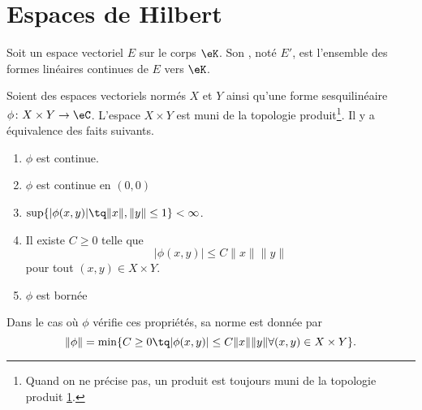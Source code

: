 
\section{Espaces de Hilbert}

\begin{definition}      \label{DEFooKSDFooGIBtrG}
	Soit un espace vectoriel \( E\) sur le corps \( \eK\). Son , noté \( E'\), est l'ensemble des formes linéaires continues de \( E\) vers \( \eK\).
\end{definition}

\begin{proposition}      \label{PROPooQFTSooPFfbCc}
    Soient des espaces vectoriels normés \( X\) et \( Y\) ainsi qu'une forme sesquilinéaire \( \phi\colon X\times Y\to \eC\). L'espace \( X\times Y\) est muni de la topologie produit\footnote{Quand on ne précise pas, un produit est toujours muni de la topologie produit \ref{}.}. Il y a équivalence des faits suivants.
	\begin{enumerate}
        \item       \label{ITEMooWMFBooOWPzgP}
		      \( \phi\) est continue.
          \item       \label{ITEMooSFQZooHNcWwH}
		      \( \phi\) est continue en \( (0,0)\)
          \item     \label{ITEMooWSWQooSYzOol}
              \( \sup\{ | \phi(x,y) |\tq \| x \|, \| y \|\leq 1 \}<\infty\).
          \item       \label{ITEMooRKHQooMVXlYD}
		      Il existe \( C\geq 0\) telle que 
              \begin{equation}
                | \phi(x,y) |\leq C\| x \|\| y \|  
              \end{equation}
                pour tout \( (x,y)\in X\times Y\).
          \item       \label{ITEMooLWDCooLIGVDs}
		      \( \phi\) est bornée
	\end{enumerate}
    Dans le cas où \( \phi\) vérifie ces propriétés, sa norme est donnée par
	\begin{equation}
		\| \phi \|=\min\{  C\geq 0\tq | \phi(x,y) |\leq C\| x \|\| y \|\forall (x,y)\in X\times Y  \}.
	\end{equation}
\end{proposition}



